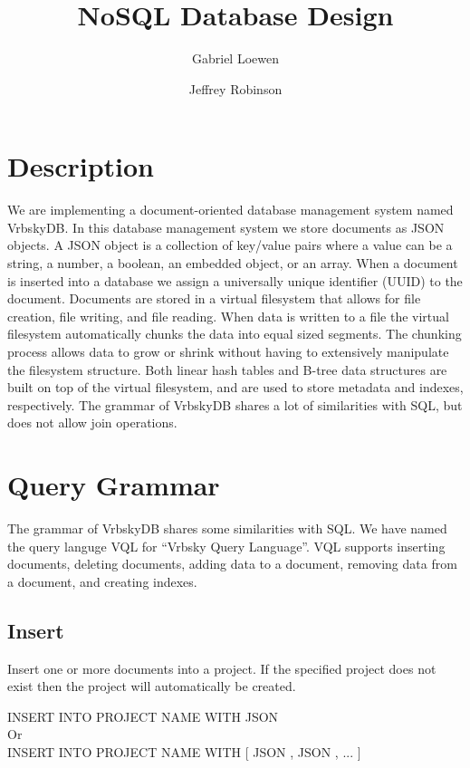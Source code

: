 \documentclass{article}
\newcommand\la{\textlangle\xspace}
\newcommand\ra{\textrangle\xspace}
\begin{document}
\title{NoSQL Database Design}
\author{Gabriel Loewen \and Jeffrey Robinson}

\maketitle

\section{Description}
We are implementing a document-oriented database management system named VrbskyDB.  In this database management system we store documents as JSON objects.  A JSON object is a collection of key/value pairs where a value can be a string, a number, a boolean, an embedded object, or an array.  When a document is inserted into a database we assign a universally unique identifier (UUID) to the document.  Documents are stored in a virtual filesystem that allows for file creation, file writing, and file reading.  When data is written to a file the virtual filesystem automatically chunks the data into equal sized segments.  The chunking process allows data to grow or shrink without having to extensively manipulate the filesystem structure.  Both linear hash tables and B-tree data structures are built on top of the virtual filesystem, and are used to store metadata and indexes, respectively.  The grammar of VrbskyDB shares a lot of similarities with SQL, but does not allow join operations.

\section{Query Grammar}
The grammar of VrbskyDB shares some similarities with SQL.  We have named the query languge VQL for ``Vrbsky Query Language''.  VQL supports inserting documents, deleting documents, adding data to a document, removing data from a document, and creating indexes.

\subsection{Insert}
Insert one or more documents into a project.  If the specified project does not exist then the project will automatically be created.
\begin{center}
INSERT INTO \la PROJECT NAME \ra WITH \la JSON \ra \\
Or \\
INSERT INTO \la PROJECT NAME \ra WITH [ \la JSON \ra, \la JSON \ra, ... ]
\end{center}
\end{document}
